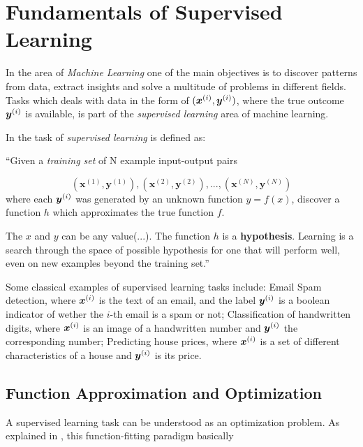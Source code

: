 \chapter{Fundamentals of Supervised Learning}
\label{cap:ml-fundamentals}

In the area of \textit{Machine Learning} one of the main objectives is to discover patterns from data, extract insights and solve a multitude of problems in different fields. Tasks which deals with data in the form of $(\bm{x}^{(i)},\bm{y}^{(i)})$, where the true outcome $\bm{y}^{(i)}$ is available, is part of the \textit{supervised learning} area of machine learning.

In \cite{aima:2010} the task of \textit{supervised learning} is defined as:

\begin{displayquote}
``Given a \textit{training set} of N example input-output pairs

$$(\bm{x}^{(1)},\bm{y}^{(1)}), (\bm{x}^{(2)},\bm{y}^{(2)}), ..., (\bm{x}^{(N)},\bm{y}^{(N)})$$
where each $\bm{y}^{(i)}$ was generated by an unknown function $y = f(x)$, discover a function $h$ which approximates the true function $f$.

The $x$ and $y$ can be any value(...). The function $h$ is a \textbf{hypothesis}. Learning is a search through the space of possible hypothesis for one that will perform well, even on new examples beyond the training set.''
\end{displayquote}

Some classical examples of supervised learning tasks include: Email Spam detection, where $\bm{x}^{(i)}$ is the text of an email, and the label $\bm{y}^{(i)}$ is a boolean indicator of wether the $i$-th email is a spam or not; Classification of handwritten digits, where $\bm{x}^{(i)}$ is an image of a handwritten number and $\bm{y}^{(i)}$ the corresponding number; Predicting house prices, where $\bm{x}^{(i)}$ is a set of different characteristics of a house and $\bm{y}^{(i)}$ is its price.

\section{Function Approximation and Optimization}

A supervised learning task can be understood as an optimization problem. As explained in \cite{hastie2009elements}, this function-fitting paradigm basically


